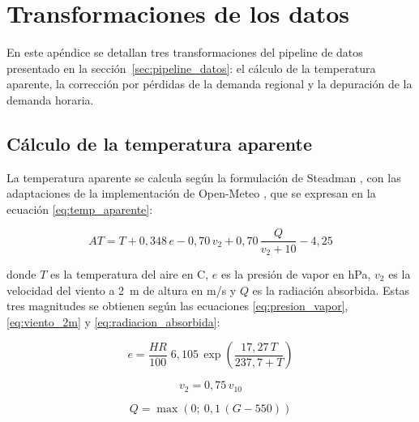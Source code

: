 
\chapter{Transformaciones de los datos} %

\label{AppendixB}

En este apéndice se detallan tres transformaciones del pipeline de datos presentado en la sección~\ref{sec:pipeline_datos}: el cálculo de la temperatura aparente, la corrección por pérdidas de la demanda regional y la depuración de la demanda horaria.

\section{Cálculo de la temperatura aparente}
\label{sec:apendice_temp_aparente}

La temperatura aparente se calcula según la formulación de Steadman \cite{steadman1994apparent}, con las adaptaciones de la implementación de Open-Meteo \cite{openMeteoCodigo}, que se expresan en la ecuación \ref{eq:temp_aparente}:

\begin{equation}
	AT = T + 0{,}348\,e - 0{,}70\,v_2 + 0{,}70\,\frac{Q}{v_2 + 10} - 4{,}25
	\label{eq:temp_aparente}
\end{equation}

\noindent donde \(T\) es la temperatura del aire en \textdegree C, \(e\) es la presión de vapor en hPa, \(v_2\) es la velocidad del viento a 2~m de altura en m/s y \(Q\) es la radiación absorbida. Estas tres magnitudes se obtienen según las ecuaciones \ref{eq:presion_vapor}, \ref{eq:viento_2m} y \ref{eq:radiacion_absorbida}:

\begin{equation}
	e = \frac{HR}{100}\; 6{,}105\, \exp\!\left(\frac{17{,}27\, T}{237{,}7 + T}\right)
	\label{eq:presion_vapor}
\end{equation}

\begin{equation}
	v_2 = 0{,}75\, v_{10}
	\label{eq:viento_2m}
\end{equation}

\begin{equation}
	Q = \max\left(0;\ 0{,}1\,(G - 550)\right)
	\label{eq:radiacion_absorbida}
\end{equation}

